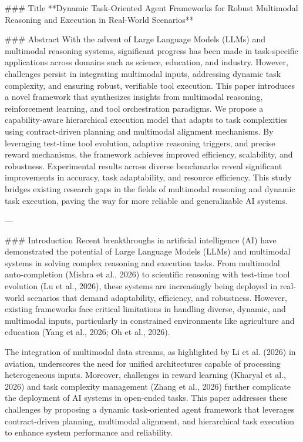 ### Title
**Dynamic Task-Oriented Agent Frameworks for Robust Multimodal Reasoning and Execution in Real-World Scenarios**

### Abstract
With the advent of Large Language Models (LLMs) and multimodal reasoning systems, significant progress has been made in task-specific applications across domains such as science, education, and industry. However, challenges persist in integrating multimodal inputs, addressing dynamic task complexity, and ensuring robust, verifiable tool execution. This paper introduces a novel framework that synthesizes insights from multimodal reasoning, reinforcement learning, and tool orchestration paradigms. We propose a capability-aware hierarchical execution model that adapts to task complexities using contract-driven planning and multimodal alignment mechanisms. By leveraging test-time tool evolution, adaptive reasoning triggers, and precise reward mechanisms, the framework achieves improved efficiency, scalability, and robustness. Experimental results across diverse benchmarks reveal significant improvements in accuracy, task adaptability, and resource efficiency. This study bridges existing research gaps in the fields of multimodal reasoning and dynamic task execution, paving the way for more reliable and generalizable AI systems.

---

### Introduction
Recent breakthroughs in artificial intelligence (AI) have demonstrated the potential of Large Language Models (LLMs) and multimodal systems in solving complex reasoning and execution tasks. From multimodal auto-completion (Mishra et al., 2026) to scientific reasoning with test-time tool evolution (Lu et al., 2026), these systems are increasingly being deployed in real-world scenarios that demand adaptability, efficiency, and robustness. However, existing frameworks face critical limitations in handling diverse, dynamic, and multimodal inputs, particularly in constrained environments like agriculture and education (Yang et al., 2026; Oh et al., 2026).

The integration of multimodal data streams, as highlighted by Li et al. (2026) in aviation, underscores the need for unified architectures capable of processing heterogeneous inputs. Moreover, challenges in reward learning (Kharyal et al., 2026) and task complexity management (Zhang et al., 2026) further complicate the deployment of AI systems in open-ended tasks. This paper addresses these challenges by proposing a dynamic task-oriented agent framework that leverages contract-driven planning, multimodal alignment, and hierarchical task execution to enhance system performance and reliability.

